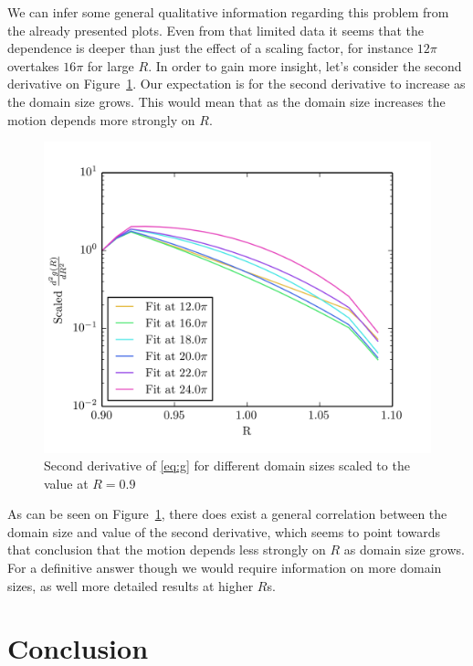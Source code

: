 \documentclass[11pt,a4paper]{article}
\begin{document}
We can infer some general qualitative information regarding this problem from the already presented plots.
Even from that limited data it seems that the dependence is deeper than just the effect of a scaling factor, for instance $12\pi$ overtakes $16\pi$ for large $R$.
In order to gain more insight, let's consider the second derivative on Figure~\ref{img:2der}.
Our expectation is for the second derivative to increase as the domain size grows.
This would mean that as the domain size increases the motion depends more strongly on $R$.

\begin{figure}[h!]
    \centering
    \includegraphics[width=\textwidth]{scaled_fit}
    \caption{Second derivative of \eqref{eq:g} for different domain sizes scaled to the value at $R=0.9$}\label{img:2der}
\end{figure}

As can be seen on Figure~\ref{img:2der}, there does exist a general correlation between the domain size and value of the second derivative, which seems to point towards that conclusion that the motion depends less strongly on $R$ as domain size grows.
For a definitive answer though we would require information on more domain sizes, as well more detailed results at higher $R$s.

\section{Conclusion}

\newpage


\end{document}
